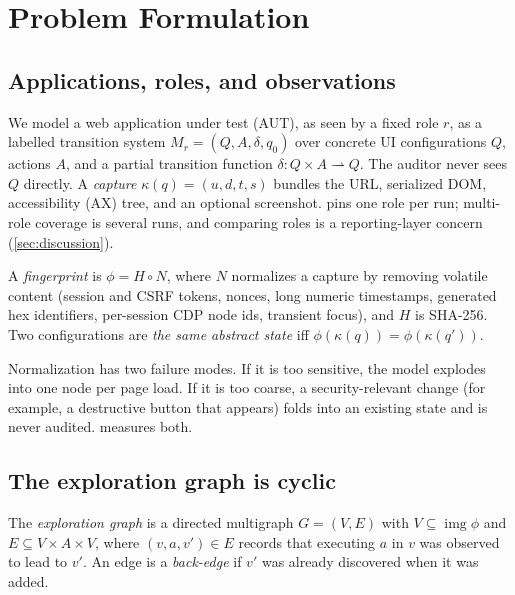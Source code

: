 \section{Problem Formulation}
\label{sec:model}

\subsection{Applications, roles, and observations}

We model a web application under test (AUT), as seen by a fixed role $r$, as a
labelled transition system $M_r=(Q,A,\delta,q_0)$ over concrete UI
configurations $Q$, actions $A$, and a partial transition function
$\delta:Q\times A\rightharpoonup Q$. The auditor never sees $Q$ directly. A
\emph{capture} $\kappa(q)=(u,d,t,s)$ bundles the URL, serialized DOM,
accessibility (AX) tree, and an optional screenshot. \sys{} pins one role per
run; multi-role coverage is several runs, and comparing roles is a
reporting-layer concern (\cref{sec:discussion}).

\begin{definition}
A \emph{fingerprint} is $\phi = H\circ N$, where $N$ normalizes a capture by
removing volatile content (session and CSRF tokens, nonces, long numeric
timestamps, generated hex identifiers, per-session CDP node ids, transient
focus), and $H$ is SHA-256. Two configurations are \emph{the same abstract
state} iff $\phi(\kappa(q))=\phi(\kappa(q'))$.
\end{definition}

Normalization has two failure modes. If it is too sensitive, the model
explodes into one node per page load. If it is too coarse, a security-relevant
change (for example, a destructive button that appears) folds into an existing
state and is never audited.  measures both.

\subsection{The exploration graph is cyclic}

\begin{definition}
The \emph{exploration graph} is a directed multigraph $G=(V,E)$ with
$V\subseteq\operatorname{img}\phi$ and $E\subseteq V\times A\times V$, where
$(v,a,v')\in E$ records that executing $a$ in $v$ was observed to lead to $v'$.
An edge is a \emph{back-edge} if $v'$ was already discovered when it was added.
\end{definition}

